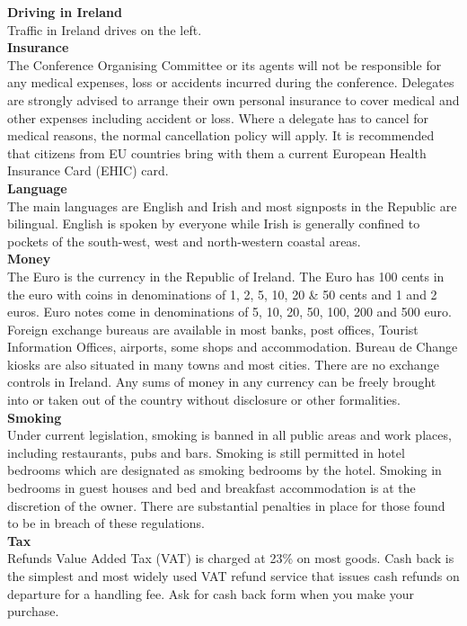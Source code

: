 {\large \textbf{Driving in Ireland}}\\
Traffic in Ireland drives on the left.\\

{\large \textbf{Insurance}}\\
The Conference Organising Committee or its agents will not be responsible for any medical expenses, loss or accidents incurred during the conference. Delegates are strongly advised to arrange their own personal insurance to cover medical and other expenses including accident or loss. Where a delegate has to cancel for medical reasons, the normal cancellation policy will apply. It is recommended that citizens from EU countries bring with them a current European Health Insurance Card (EHIC) card.\\

{\large \textbf{Language}}\\
The main languages are English and Irish and most signposts in the Republic are bilingual. English is spoken by everyone while Irish is generally confined to pockets of the south-west, west and north-western coastal areas.\\

{\large \textbf{Money}}\\
The Euro is the currency in the Republic of Ireland. The Euro has 100 cents in the euro with coins in denominations of 1, 2, 5, 10, 20 \& 50 cents and 1 and 2 euros. Euro notes come in denominations of 5, 10, 20, 50, 100, 200 and 500 euro. Foreign exchange bureaus are available in most banks, post offices, Tourist Information Offices, airports, some shops and accommodation. Bureau de Change kiosks are also situated in many towns and most cities. There are no exchange controls in Ireland. Any sums of money in any currency can be freely brought into or taken out of the country without disclosure or other formalities.\\

{\large \textbf{Smoking}}\\
Under current legislation, smoking is banned in all public areas and work places, including restaurants, pubs and bars. Smoking is still permitted in hotel bedrooms which are designated as smoking bedrooms by the hotel. Smoking in bedrooms in guest houses and bed and breakfast accommodation is at the discretion of the owner. There are substantial penalties in place for those found to be in breach of these regulations.\\

{\large \textbf{Tax}}\\
Refunds Value Added Tax (VAT) is charged at 23\% on most goods. Cash back is the simplest and most widely used VAT refund service that issues cash refunds on departure for a handling fee. Ask for cash back form when you make your purchase.\\

